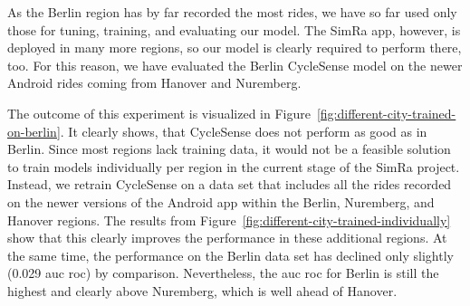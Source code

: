 As the Berlin region has by far recorded the most rides, we have so far used only those for tuning, training, and evaluating our model.
The SimRa app, however, is deployed in many more regions, so our model is clearly required to perform there, too.
For this reason, we have evaluated the Berlin CycleSense model on the newer Android rides coming from Hanover and Nuremberg.

The outcome of this experiment is visualized in Figure~\ref{fig:different-city-trained-on-berlin}.
It clearly shows, that CycleSense does not perform as good as in Berlin.
Since most regions lack training data, it would not be a feasible solution to train models individually per region in the current stage of the SimRa project.
Instead, we retrain CycleSense on a data set that includes all the rides recorded on the newer versions of the Android app within the Berlin, Nuremberg, and Hanover regions.
The results from Figure~\ref{fig:different-city-trained-individually} show that this clearly improves the performance in these additional regions.
At the same time, the performance on the Berlin data set has declined only slightly (0.029 \ac{auc} \ac{roc}) by comparison.
Nevertheless, the \ac{auc} \ac{roc} for Berlin is still the highest and clearly above Nuremberg, which is well ahead of Hanover.

